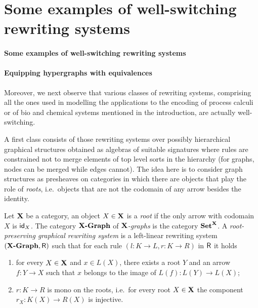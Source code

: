 \chapter{Some examples of well-switching rewriting systems}

\subsubsection{Some examples of well-switching rewriting systems}

\subsubsection{Equipping hypergraphs with equivalences}


Moreover, we next observe that various classes of rewriting systems,
comprising all the ones used in modelling the applications to the
encoding of process calculi or of bio and chemical systems mentioned
in the introduction, are actually well-switching.



A first class consists of those rewriting systems over
possibly hierarchical graphical structures obtained as algebras of
suitable signatures where rules are constrained not to merge elements
of top level sorts in the hierarchy (for graphs, nodes can be
merged while edges cannot). The idea here is to consider graph
structures as presheaves on categories in which there are objects that play 
the role of \emph{roots}, i.e.~objects that are not the codomain of 
any arrow besides the identity. 

\begin{definition}
	Let $\textbf {\textup{X}}$ be a category, an object $X\in \textbf {\textup{X}}$ is a \emph{root} if the only arrow with codomain $X$ is $\mathsf{id}_{X}$.
	The category $\textbf{\textup{{X}-Graph}}$ of \emph{$\textbf {\textup{X}}$-graphs} is the category
	$\textbf {\textup{Set}}^{\textbf {\textup{X}}}$. A
	\emph{root-preserving graphical rewriting system} is a left-linear
	rewriting system $(\textbf{\textup{{X}-Graph}}, \mathsf{R})$ such that for each rule
	$(l\colon K\to L, r\colon K\to R)$ in $\mathsf{R}$ it holds
	\begin{enumerate}
		\item for every $X\in \textbf {\textup{X}}$ and $x\in L(X)$, there exists a root $Y$
		and an arrow $f\colon Y\to X$ such that $x$ belongs to the image of
		$L(f)\colon L(Y)\to L(X)$;
		\item $r\colon K\to R$ is mono on the roots, i.e.~for every root $X\in \textbf {\textup{X}}$ the component $r_X:K(X)\to R(X)$ is injective.
	\end{enumerate}
\end{definition}

